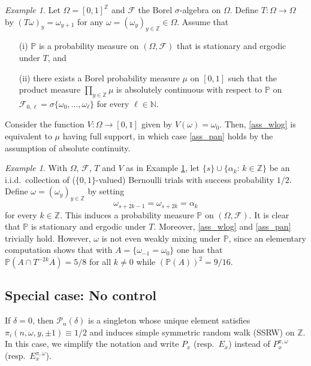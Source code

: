 \documentclass[a4paper]{amsart}
\numberwithin{equation}{section}
\theoremstyle{plain}
\theoremstyle{remark}
\newtheorem{example}[theorem]{\sc Example}
\begin{document}
\begin{example}
  \label{ex-first}
	Let $\Omega = [0,1]^\mathbb{Z}$ and $\mathcal{F}$ the Borel $\sigma$-algebra on $\Omega$. Define $T:\Omega\to\Omega$ by $(T\omega)_y = \omega_{y+1}$ for any $\omega = (\omega_y)_{y\in\mathbb{Z}}\in\Omega$. Assume that
	\begin{itemize}
		\item [(i)] $\mathbb{P}$ is a probability measure on $(\Omega,\mathcal{F})$ that is stationary and ergodic under $T$, and
		\item [(ii)] there exists a Borel probability measure $\mu$ on $[0,1]$ such that the product measure $\prod_{y\in\mathbb{Z}}\mu$ is absolutely continuous with respect to $\mathbb{P}$ on $\mathcal{F}_{0,\ell} = \sigma\{\omega_0,\ldots,\omega_\ell\}$ for every $\ell\in\mathbb{N}$.
	\end{itemize}
	Consider the function $V:\Omega\to[0,1]$ given by $V(\omega) = \omega_0$. Then, \eqref{ass_wlog} is equivalent to $\mu$ having full support, in which case \eqref{ass_pan} holds by the assumption of absolute continuity.
\end{example}
\begin{example}
  \label{ex-nonmix}
  {}{
With $\Omega$, $\mathcal{F}$, $T$ and $V$ as 
in Example \ref{ex-first},
let $\{s\}\cup\{\alpha_k:\,k\in\mathbb{Z}\}$ be an i.i.d.\ collection of ($\{0,1\}$-valued) Bernoulli trials with success probability $1/2$. Define $\omega = (\omega_y)_{y\in\mathbb{Z}}$ by setting
$$\omega_{s+2k-1} = \omega_{s+2k} = \alpha_k$$
for every $k\in\mathbb{Z}$. This induces a probability measure $\mathbb{P}$ on $(\Omega,\mathcal{F})$. It is clear that $\mathbb{P}$ is stationary and ergodic under $T$. Moreover, \eqref{ass_wlog} and \eqref{ass_pan} trivially 
hold. However, $\omega$ is not even weakly mixing under $\mathbb{P}$,
since an elementary computation shows that with $A=\{\omega_{-1}=\omega_0\}$
one has that $\mathbb{P}(A\cap T^{-2k} A)=5/8$ for all $k\neq 0$ while 
$(\mathbb{P}(A))^2=9/16$.}
\end{example}

\subsection{Special case: No control}\label{subseczeroc}

If $\delta = 0$, then $\mathcal{P}_n(\delta)$ is a singleton whose unique element satisfies $\pi_i(n,\omega,y,\pm1) \equiv 1/2$ and induces simple symmetric random walk (SSRW) on $\mathbb{Z}$. In this case, we simplify the notation and write $P_x$ (resp.\ $E_x$) instead of $P_x^{\pi,\omega}$ (resp.\ $E_x^{\pi,\omega}$).
\end{document}
